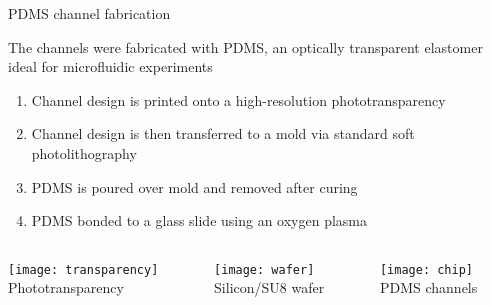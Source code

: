 

\begin{frame}[c]{PDMS channel fabrication}

	The channels were fabricated with PDMS, an optically transparent elastomer ideal for microfluidic experiments \\
	
	

	{\footnotesize
	\begin{enumerate}
		\item Channel design is printed onto a high-resolution phototransparency
		\item Channel design is then transferred to a mold via standard soft photolithography
		\item PDMS is poured over mold and removed after curing
		\item PDMS bonded to a glass slide using an oxygen plasma
	\end{enumerate}
	}
	
	
	\begin{columns}[t]
		\begin{column}[T]{1.67in}
			{\centering
				\texttt{[image: transparency]} \\
				Phototransparency \\
				\par
			}
		\end{column}
		
		\begin{column}[T]{1.67in}
			{\centering
				\texttt{[image: wafer]} \\
				Silicon/SU8 wafer \\
				\par
			}
		\end{column}
		
		\begin{column}[T]{1.67in}
			{\centering
				\texttt{[image: chip]} \\
				PDMS channels
				\par
			}
		\end{column}

	\end{columns}


\end{frame}


